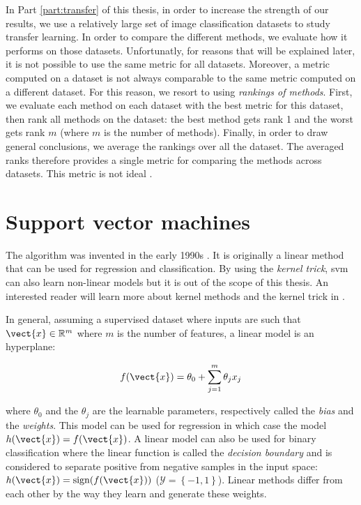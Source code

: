 In Part \ref{part:transfer} of this thesis, in order to increase the strength of our results, we use a relatively large set of image classification datasets to study transfer learning. In order to compare the different methods, we evaluate how it performs on those datasets. Unfortunatly, for reasons that will be explained later, it is not possible to use the same metric for all datasets. Moreover, a metric computed on a dataset is not always comparable to the same metric computed on a different dataset. For this reason, we resort to using \textit{rankings of methods}. First, we evaluate each method on each dataset with the best metric for this dataset, then rank all methods on the dataset: the best method gets rank 1 and the worst gets rank $m$ (where $m$ is the number of methods). Finally, in order to draw general conclusions, we average the rankings over all the dataset. The averaged ranks therefore provides a single metric for comparing the methods across datasets. This metric is not ideal .


\section{Support vector machines}

The  algorithm was invented in the early 1990s \parencite{boser1992training}. It is originally a linear method that can be used for regression and classification. By using the \textit{kernel trick}, \acrshort{svm} can also learn non-linear models but it is out of the scope of this thesis. An interested reader will learn more about kernel methods and the kernel trick in \parencite{friedman2017elements}.

In general, assuming a supervised dataset where inputs are such that $\vect{x} \in \mathbb{R}^m$ where $m$ is the number of features, a linear model is an hyperplane:

\begin{equation}
\label{eqn:backml:linearmodel}
f(\vect{x}) = \theta_0 + \sum_{j=1}^m \theta_j x_j  
\end{equation}

where $\theta_0$ and the $\theta_j$ are the learnable parameters, respectively called the \textit{bias} and the \textit{weights}. This model can be used for regression in which case the model $h(\vect{x}) = f(\vect{x})$. A linear model can also be used for binary classification where the linear function is called the \textit{decision boundary} and is considered to separate positive from negative samples in the input space: $h(\vect{x}) = \text{sign}(f(\vect{x}))$ (\ie $\mathcal{Y} = \left\{-1, 1\right\}$). Linear methods differ from each other by the way they learn and generate these weights.

